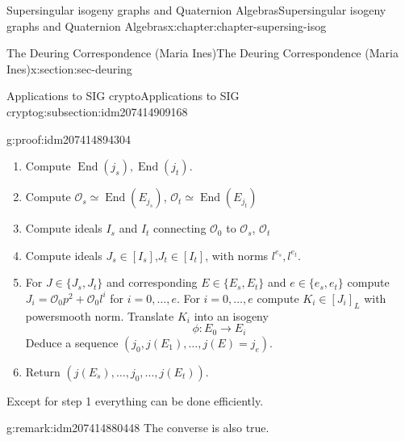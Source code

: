 \documentclass[oneside,10pt,]{book}
\numberwithin{equation}{section}
\newcommand{\lb}{[}
\newcommand{\rb}{]}
\newcommand{\ints}{\mathcal{O}}
\DeclareMathOperator{\End}{End}
\begin{document}
\begin{chapterptx}{Supersingular isogeny graphs and Quaternion Algebras}{}{Supersingular isogeny graphs and Quaternion Algebras}{}{}{x:chapter:chapter-supersing-isog}
\begin{sectionptx}{The Deuring Correspondence (Maria Ines)}{}{The Deuring Correspondence (Maria Ines)}{}{}{x:section:sec-deuring}
\begin{subsectionptx}{Applications to SIG crypto}{}{Applications to SIG crypto}{}{}{g:subsection:idm207414909168}
\begin{proofptx}{}{g:proof:idm207414894304}
\begin{enumerate}
\item{}Compute \(\End(j_s),\End(j_t)\).%
\item{}Compute \(\ints_s \simeq \End(E_{j_s})\), \(\ints_t \simeq \End(E_{j_t})\)%
\item{}Compute ideals \(I_s\) and \(I_t\) connecting \(\ints_0 \) to \(\ints_s\), \(\ints_t\)%
\item{}Compute ideals \(J_s \in \lb I_s \rb\),\(J_t \in \lb I_t \rb\), with norms \(l^{e_s},l^{e_t}\).%
\item{}For \(J \in \{J_s,J_t\}\) and corresponding \(E \in \{E_s,E_t\}\) and \(e\in \{e_s, e_t\}\) compute \(J_i = \ints_0 p^2 + \ints_0 l^i\) for \(i = 0,\ldots, e\). For \(i = 0,\ldots, e\) compute \(K_i \in \lb J_i \rb_L\) with powersmooth norm. Translate \(K_i\) into an isogeny%
\begin{equation*}
\phi\colon E_0 \to E_i
\end{equation*}
Deduce a sequence \((j_0, j(E_1),\ldots,j(E) = j_e)\).%
\item{}Return \((j(E_s), \ldots,j_0, \ldots,j(E_t))\).%
\end{enumerate}
%
\par
Except for step 1 everything can be done efficiently.%
\end{proofptx}
\begin{remark}{}{g:remark:idm207414880448}%
The converse is also true.%
\end{remark}
\end{subsectionptx}
\end{sectionptx}
\end{chapterptx}
%
%
\typeout{************************************************}
\typeout{************************************************}
%
\end{document}

